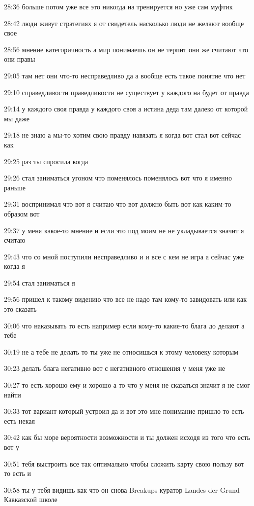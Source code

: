 28:36
больше потом уже все это никогда на тренируется но уже сам муфтик

28:42
люди живут стратегиях я от свидетель насколько люди не желают вообще свое

28:56
мнение категоричность а мир понимаешь он не терпит они же считают что они правы

29:05
там нет они что-то несправедливо да а вообще есть такое понятие что нет

29:10
справедливости праведливости не существует у каждого на будет от правда

29:14
у каждого своя правда у каждого своя а истина деда там далеко от которой мы даже

29:18
не знаю а мы-то хотим свою правду навязать я когда вот стал вот сейчас как

29:25
раз ты спросила когда

29:26
стал заниматься угоном что поменялось поменялось вот что я именно раньше

29:31
воспринимал что вот я считаю что вот должно быть вот как каким-то образом вот

29:37
у меня какое-то мнение и если это под моим не не укладывается значит я считаю

29:43
что со мной поступили несправедливо и и все с кем не игра а сейчас уже когда я

29:54
стал заниматься я

29:56
пришел к такому видению что все не надо там кому-то завидовать или как это сказать

30:06
что наказывать то есть например если кому-то какие-то блага до делают а тебе

30:19
не а тебе не делать то ты уже не относишься к этому человеку которым

30:23
делать блага негативно вот с негативного отношения у меня уже не

30:27
то есть хорошо ему и хорошо а то что у меня не сказаться значит я не смог найти

30:33
тот вариант который устроил да и вот это мне понимание пришло то есть есть некая

30:42
как бы море вероятности возможности и ты должен исходя из того что есть вот у

30:51
тебя выстроить все так оптимально чтобы сложить карту свою пользу вот то есть и

30:58
ты у тебя видишь как что он снова Breakups куратор Landes der Grund Кавказской школе

